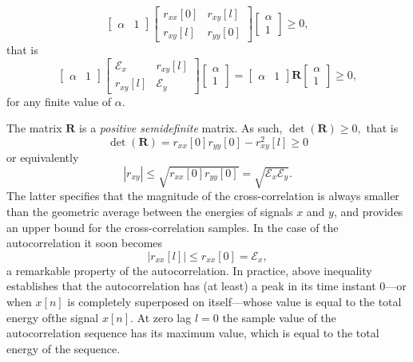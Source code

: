 \documentclass[\documentfontsize, twocolumn]{\classname}
\begin{document}
\[
    \begin{bmatrix} \alpha & 1 \end{bmatrix}\begin{bmatrix} r_{xx}[0] & r_{xy}[l] \\ r_{xy}[l] & r_{yy}[0]\end{bmatrix}\begin{bmatrix}\alpha \\ 1\end{bmatrix} \geq 0,
\]
that is
\[
    \begin{bmatrix} \alpha & 1 \end{bmatrix}\begin{bmatrix} \mathcal E_x & r_{xy}[l] \\ r_{xy}[l] & \mathcal E_y \end{bmatrix}\begin{bmatrix}\alpha \\ 1\end{bmatrix} = \begin{bmatrix} \alpha & 1 \end{bmatrix}\bm{R}\begin{bmatrix} \alpha \\ 1 \end{bmatrix} \geq 0,
\]
for any finite value of $\alpha$.

The matrix $\bm R$ is a \emph{positive semidefinite} matrix. As such, $\det {(\bm R)} \geq 0,$ that is \[\det {(\bm R)} =r_{xx}[0]r_{yy}[0] - r^2_{xy}[l] \geq 0\] or equivalently \begin{equation}\label{eqn:crossCorrelationUpperBound}|r_{xy}| \leq \sqrt{r_{xx}[0]r_{yy}[0]}= \sqrt{\mathcal E_x\mathcal E_y}.\end{equation} The latter specifies that the magnitude of the cross-correlation is always smaller than the geometric average between the energies of signals $x$ and $y$, and provides an upper bound for the cross-correlation samples. In the case of the autocorrelation it soon becomes
\begin{equation}\label{eqn:autocorrelationUpperBound}
    |r_{xx}[l]| \leq r_{xx}[0] = \mathcal E_x,
\end{equation}
a remarkable property of the autocorrelation. In practice, above inequality establishes that the autocorrelation has (at least) a peak in its time instant $0$---or when $x[n]$ is completely superposed on itself---whose value is equal to the total energy ofthe signal $x[n]$. At zero lag $l=0$ the sample value of the autocorrelation sequence has its maximum value, which is equal to the total energy of the sequence.
\end{document}
